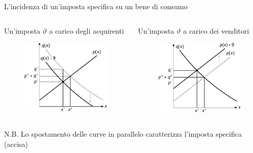 \documentclass[aspectratio=64,12pt]{beamer}
\begin{document}
\begin{frame}{L'incidenza di un'imposta specifica su un bene di consumo}
\begin{columns}
\begin{column}{.5\columnwidth}
Un'imposta $\vartheta$ a carico degli acquirenti

\begin{figure}[htbp]
\centering
\includegraphics[width=\textwidth]{./figure/incidenza-2.pdf}
\end{figure}
\end{column}

\begin{column}{.5\columnwidth}
Un'imposta $\vartheta$ a carico dei venditori

\begin{figure}[htbp]
\centering
\includegraphics[width=\textwidth]{./figure/incidenza-3.pdf}
\end{figure}
\end{column}
\end{columns}
\medskip
N.B. Lo spostamento delle curve in parallelo caratterizza l'imposta specifica (accisa)
\end{frame}
\end{document}
